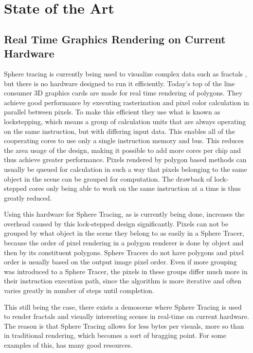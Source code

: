 \chapter{State of the Art}

	\section{ Real Time Graphics Rendering on Current Hardware } 

		Sphere tracing is currently being used to visualize complex data such
		as fractals \cite{TODO}, but there is no hardware designed to run it
		efficiently.  Today's top of the line consumer 3D graphics cards are
		made for real time rendering of polygons. They achieve good performance
		by executing rasterization and pixel color calculation in parallel
		between pixels. To make this efficient they use what is known as
		lockstepping, which means a group of calculation units that are always
		operating on the same instruction, but with differing input data. This
		enables all of the cooperating cores to use only a single instruction
		memory and bus. This reduces the area usage of the design, making it
		possible to add more cores per chip and thus achieve greater
		performance. Pixels rendered by polygon based methods can usually be
		queued for calculation in such a way that pixels belonging to the same
		object in the scene can be grouped for computation. The drawback of
		lock-stepped cores only being able to work on the same instruction at a
		time is thus greatly reduced.
		
		Using this hardware for Sphere Tracing, as is currently being done,
		increases the overhead caused by this lock-stepped design
		significantly. Pixels can not be grouped by what object in the scene
		they belong to as easily in a Sphere Tracer, because the order of pixel
		rendering in a polygon renderer is done by object and then by its
		constituent polygons. Sphere Tracers do not have polygons and pixel
		order is usually based on the output image pixel order. Even if more
		grouping was introduced to a Sphere Tracer, the pixels in these groups
		differ much more in their instruction execution path, since the
		algorithm is more iterative and often varies greatly in number of steps
		until completion.
		
		This still being the case, there exists a demoscene where Sphere
		Tracing is used to render fractals and visually interesting scenes in
		real-time on current hardware. The reason is that Sphere Tracing allows
		for less bytes per visuals, more so than in traditional rendering,
		which becomes a sort of bragging point. For some examples of
		this, \cite{InigoQuilez} has many good resources.
		
